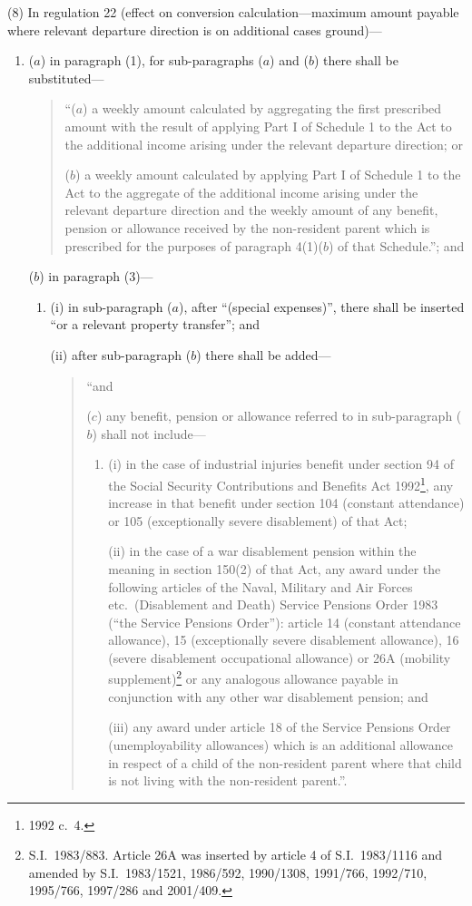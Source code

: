 \documentclass[12pt,a4paper]{article}
\begin{document}
(8) In regulation 22 (effect on conversion calculation—maximum amount payable where relevant departure direction is on additional cases ground)—
\begin{enumerate}\item[]
($a$) in paragraph (1), for sub-paragraphs ($a$)  and ($b$)  there shall be substituted—
\begin{quotation}
“($a$) a weekly amount calculated by aggregating the first prescribed amount with the result of applying Part I of Schedule 1 to the Act to the additional income arising under the relevant departure direction; or

($b$) a weekly amount calculated by applying Part I of Schedule 1 to the Act to the aggregate of the additional income arising under the relevant departure direction and the weekly amount of any benefit, pension or allowance received by the non-resident parent which is prescribed for the purposes of paragraph 4(1)($b$)  of that Schedule.”; and
\end{quotation}

($b$) in paragraph (3)—
\begin{enumerate}\item[]
(i) in sub-paragraph ($a$), after “(special expenses)”, there shall be inserted “or a relevant property transfer”; and

(ii) after sub-paragraph ($b$)  there shall be added—
\begin{quotation}
“and

($c$) 
any benefit, pension or allowance referred to in sub-paragraph ($b$)  shall not include—
\begin{enumerate}\item[]
(i) 
in the case of industrial injuries benefit under section 94 of the Social Security Contributions and Benefits Act 1992\footnote{1992 c.\ 4.}, any increase in that benefit under section 104 (constant attendance) or 105 (exceptionally severe disablement) of that Act;

(ii) 
in the case of a war disablement pension within the meaning in section 150(2) of that Act, any award under the following articles of the Naval, Military and Air Forces etc.\ (Disablement and Death) Service Pensions Order 1983 (“the Service Pensions Order”): article 14 (constant attendance allowance), 15 (exceptionally severe disablement allowance), 16 (severe disablement occupational allowance) or 26A (mobility supplement)\footnote{S.I.\ 1983/883. Article 26A was inserted by article 4 of S.I.\ 1983/1116 and amended by S.I.\ 1983/1521, 1986/592, 1990/1308, 1991/766, 1992/710, 1995/766, 1997/286 and 2001/409.} or any analogous allowance payable in conjunction with any other war disablement pension; and

(iii) 
any award under article 18 of the Service Pensions Order (unemployability allowances) which is an additional allowance in respect of a child of the non-resident parent where that child is not living with the non-resident parent.”.
\end{enumerate}
\end{quotation}
\end{enumerate}
\end{enumerate}
\end{document}
